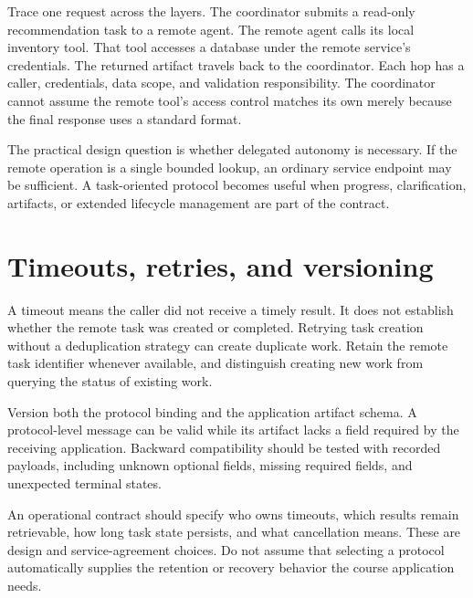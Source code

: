 Trace one request across the layers. The coordinator submits a read-only recommendation task to a remote agent. The remote agent calls its local inventory tool. That tool accesses a database under the remote service's credentials. The returned artifact travels back to the coordinator. Each hop has a caller, credentials, data scope, and validation responsibility. The coordinator cannot assume the remote tool's access control matches its own merely because the final response uses a standard format.

The practical design question is whether delegated autonomy is necessary. If the remote operation is a single bounded lookup, an ordinary service endpoint may be sufficient. A task-oriented protocol becomes useful when progress, clarification, artifacts, or extended lifecycle management are part of the contract.

\section{Timeouts, retries, and versioning}
A timeout means the caller did not receive a timely result. It does not establish whether the remote task was created or completed. Retrying task creation without a deduplication strategy can create duplicate work. Retain the remote task identifier whenever available, and distinguish creating new work from querying the status of existing work.

Version both the protocol binding and the application artifact schema. A protocol-level message can be valid while its artifact lacks a field required by the receiving application. Backward compatibility should be tested with recorded payloads, including unknown optional fields, missing required fields, and unexpected terminal states.

An operational contract should specify who owns timeouts, which results remain retrievable, how long task state persists, and what cancellation means. These are design and service-agreement choices. Do not assume that selecting a protocol automatically supplies the retention or recovery behavior the course application needs.

